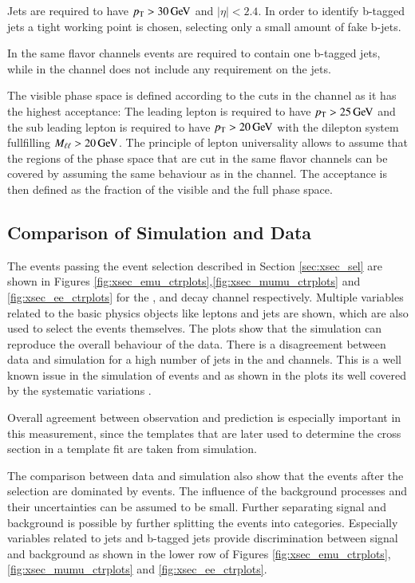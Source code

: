 Jets are required to have $p_{\mathrm{T}} > 30 \,\text{Ge\hspace{-.08em}V}$ and $|\eta|<2.4$. In order to identify b-tagged jets a tight working point is chosen, selecting only a small amount of fake b-jets.

In the same flavor channels events are required to contain one b-tagged jets, while in the \emu channel does not include any requirement on the jets.

The visible phase space is defined according to the cuts in the \emu channel as it has the highest acceptance:
The leading lepton is required to have $p_{\mathrm{T}} > 25 \,\text{Ge\hspace{-.08em}V}$ and the sub leading lepton is required to have $p_{\mathrm{T}} > 20 \,\text{Ge\hspace{-.08em}V}$ with the dilepton system
fullfilling $M_{\ell\ell} > 20 \,\text{Ge\hspace{-.08em}V}$. The principle of lepton universality allows to assume that the regions of the phase space that are cut in the 
same flavor channels can be covered by assuming the same behaviour as in the \emu channel.
The acceptance is then defined as the fraction of the visible and the full phase space. 



\subsection{Comparison of Simulation and Data}
\label{sec:xsec_datamc}

The events passing the event selection described in Section \ref{sec:xsec_sel} are shown in Figures \ref{fig:xsec_emu_ctrplots},\ref{fig:xsec_mumu_ctrplots} and \ref{fig:xsec_ee_ctrplots} for the \emu, \mumu and \ee decay channel respectively. Multiple variables related to the basic physics objects like leptons and jets are shown, which are also used to select the events themselves. The plots show that the simulation can reproduce the overall  behaviour of the data. 
There is a disagreement between data and simulation for a high number of jets in the \emu and \mumu channels. This is a well known issue in the simulation of \ttbar events and as shown in the plots its well covered by the systematic variations . 

Overall agreement between observation and prediction is especially important in this measurement, since the templates that are later used to determine the cross section in a template fit are taken from simulation.

The comparison between data and simulation also show that the events after the selection are dominated by \ttbar events. The influence of the background processes and their uncertainties can be assumed to be small.
Further separating signal and background is possible by further splitting the events into categories. Especially variables related to jets and b-tagged jets provide discrimination between signal and background as shown in the lower row of Figures 
\ref{fig:xsec_emu_ctrplots},\ref{fig:xsec_mumu_ctrplots} and \ref{fig:xsec_ee_ctrplots}.


